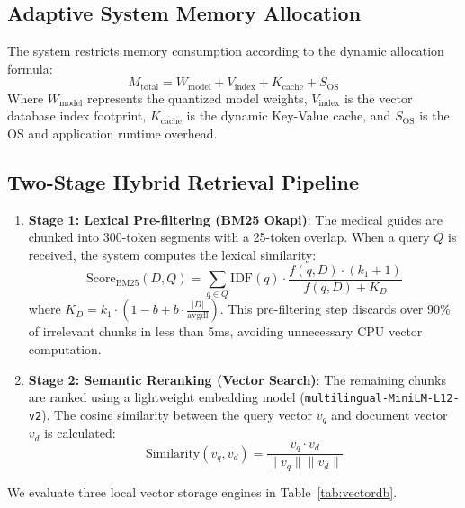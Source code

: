 \documentclass[journal,compsoc]{IEEEtran}
\begin{document}
\subsection{Adaptive System Memory Allocation}
The system restricts memory consumption according to the dynamic allocation formula:
\begin{equation}
M_{\text{total}} = W_{\text{model}} + V_{\text{index}} + K_{\text{cache}} + S_{\text{OS}}
\end{equation}
Where $W_{\text{model}}$ represents the quantized model weights, $V_{\text{index}}$ is the vector database index footprint, $K_{\text{cache}}$ is the dynamic Key-Value cache, and $S_{\text{OS}}$ is the OS and application runtime overhead.

\subsection{Two-Stage Hybrid Retrieval Pipeline}
\begin{enumerate}
\item \textbf{Stage 1: Lexical Pre-filtering (BM25 Okapi)}:
The medical guides are chunked into 300-token segments with a 25-token overlap. When a query $Q$ is received, the system computes the lexical similarity:
\begin{equation}
\text{Score}_{\text{BM25}}(D, Q) = \sum_{q \in Q} \text{IDF}(q) \cdot \frac{f(q, D) \cdot (k_1 + 1)}{f(q, D) + K_D}
\end{equation}
where $K_D = k_1 \cdot \left(1 - b + b \cdot \frac{|D|}{\text{avgdl}}\right)$. This pre-filtering step discards over 90\% of irrelevant chunks in less than 5ms, avoiding unnecessary CPU vector computation.


\item \textbf{Stage 2: Semantic Reranking (Vector Search)}:
The remaining chunks are ranked using a lightweight embedding model (\texttt{multilingual-MiniLM-L12-v2}). The cosine similarity between the query vector $v_q$ and document vector $v_d$ is calculated:
\begin{equation}
\text{Similarity}(v_q, v_d) = \frac{v_q \cdot v_d}{\|v_q\| \|v_d\|}
\end{equation}
\end{enumerate}

We evaluate three local vector storage engines in Table~\ref{tab:vectordb}.
\end{document}
